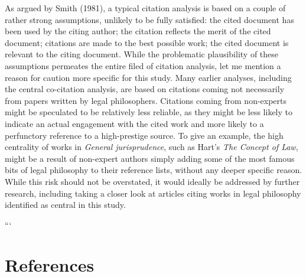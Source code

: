 \documentclass[
]{article}
\begin{document}
As argued by Smith (1981), a typical citation analysis is based on a couple of rather strong assumptions, unlikely to be fully satisfied: the cited document has been used by the citing author; the citation reflects the merit of the cited document; citations are made to the best possible work; the cited document is relevant to the citing document. While the problematic plausibility of these assumptions permeates the entire filed of citation analysis, let me mention a reason for caution more specific for this study. Many earlier analyses, including the central co-citation analysis, are based on citations coming not necessarily from papers written by legal philosophers. Citations coming from non-experts might be speculated to be relatively less reliable, as they might be less likely to indicate an actual engagement with the cited work and more likely to a perfunctory reference to a high-prestige source. To give an example, the high centrality of works in \emph{General jurisprudence}, such as Hart's \emph{The Concept of Law}, might be a result of non-expert authors simply adding some of the most famous bits of legal philosophy to their reference lists, without any deeper specific reason. While this risk should not be overstated, it would ideally be addressed by further research, including taking a closer look at articles citing works in legal philosophy identified as central in this study.

\newpage

```

\hypertarget{references}{%
\section{References}\label{references}}
\end{document}
